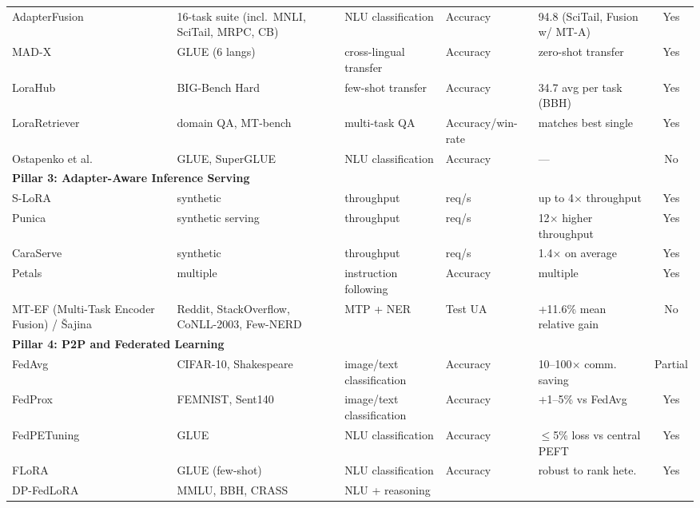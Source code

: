 \begin{table}
{\begin{tabular}{lllllc}
  AdapterFusion~\cite{Pfeiffer2021fusion} & 16-task suite (incl.\ MNLI, SciTail,
  MRPC, CB) & NLU classification & Accuracy & 94.8 (SciTail, Fusion w/ MT-A) & Yes \\
  MAD-X~\cite{PfeifferMADX2020} & GLUE (6 langs) & cross-lingual transfer &
  Accuracy & zero-shot transfer & Yes \\
  LoraHub~\cite{Huang2023} & BIG-Bench Hard & few-shot transfer & Accuracy &
  34.7 avg per task (BBH) & Yes \\
  LoraRetriever~\cite{ZhaoLoraRetriever2024} & domain QA, MT-bench & multi-task
   QA & Accuracy/win-rate & matches best single & Yes \\
  Ostapenko et al.~\cite{Ostapenko2024} & GLUE, SuperGLUE & NLU classification &
  Accuracy & --- & No \\
  \midrule
  \multicolumn{6}{l}{\textbf{Pillar 3: Adapter-Aware Inference Serving}} \\
  S-LoRA~\cite{Sheng2024} & synthetic & throughput & req/s & up to 4$\times$
  throughput & Yes \\
  Punica~\cite{Chen2023Punica} & synthetic serving & throughput & req/s &
  12$\times$ higher throughput & Yes \\
  CaraServe~\cite{Li2024CaraServe} & synthetic & throughput & req/s &
  1.4$\times$ on average & Yes \\
  Petals~\cite{Borzunov2023} & multiple & instruction following & Accuracy &
  multiple & Yes \\
  MT-EF (Multi-Task Encoder Fusion) / {\v{S}}ajina~\cite{Sajina2024} & Reddit, StackOverflow, CoNLL-2003,
  Few-NERD & MTP + NER & Test UA & +11.6\% mean relative gain & No \\
  \midrule
  \multicolumn{6}{l}{\textbf{Pillar 4: P2P and Federated Learning}} \\
  FedAvg~\cite{McMahan2017} & CIFAR-10, Shakespeare & image/text classification
   & Accuracy & 10--100$\times$ comm. saving & Partial \\
  FedProx~\cite{Li2020FedProx} & FEMNIST, Sent140 & image/text classification &
   Accuracy & +1--5\% vs FedAvg & Yes \\
  FedPETuning~\cite{ZhangFedPETuning2023} & GLUE & NLU classification &
  Accuracy & $\leq$5\% loss vs central PEFT & Yes \\
  FLoRA~\cite{WangFLoRA2024} & GLUE (few-shot) & NLU classification & Accuracy
  & robust to rank hete. & Yes \\
  DP-FedLoRA~\cite{XuDPFedLoRA2025} & MMLU, BBH, CRASS & NLU + reasoning &

\end{tabular}}
\end{table}
